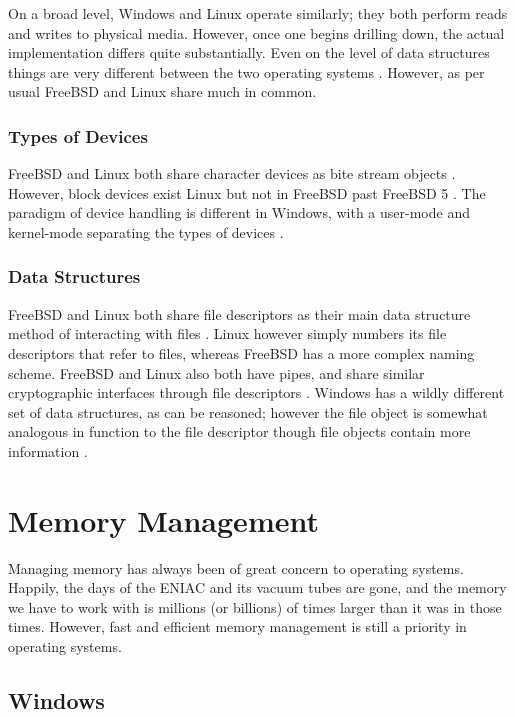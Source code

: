 \documentclass[10pt,draftclsnofoot,onecolumn,compsoc]{IEEEtran}
\begin{document}
	On a broad level, Windows and Linux operate similarly; they both perform reads and writes to physical media. However, once one begins drilling down, the actual implementation differs quite substantially. Even on the level of data structures things are very different between the two operating systems \cite{BSD} \cite{WInternals}. However, as per usual FreeBSD and Linux share much in common.	
	
	\subsubsection{Types of Devices}
	
	FreeBSD and Linux both share character devices as bite stream objects \cite{BSD} \cite{Kevin}. However, block devices exist Linux \cite{Kevin} but not in FreeBSD past FreeBSD 5 \cite{BSD}. The paradigm of device handling is different in Windows, with a user-mode and kernel-mode separating the types of devices \cite{WInternals}.
	
	\subsubsection{Data Structures}
	
	FreeBSD and Linux both share file descriptors as their main data structure method of interacting with files \cite{BSD}. Linux however simply numbers its file descriptors that refer to files, whereas FreeBSD has a more complex naming scheme. FreeBSD and Linux also both have pipes, and share similar cryptographic interfaces through file descriptors \cite{BSD}. Windows has a wildly different set of data structures, as can be reasoned; however the file object is somewhat analogous in function to the file descriptor though file objects contain more information \cite{WInternals}.
	
	\section{Memory Management}
	
	Managing memory has always been of great concern to operating systems. Happily, the days of the ENIAC and its vacuum tubes are gone, and the memory we have to work with is millions (or billions) of times larger than it was in those times. However, fast and efficient memory management is still a priority in operating systems.
	
	\subsection{Windows}
	
\end{document}

